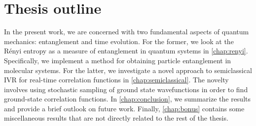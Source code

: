 \section{Thesis outline}

In the present work, we are concerned with two fundamental aspects of quantum mechanics: entanglement and time evolution.
For the former, we look at the Rényi entropy as a measure of entanglement in quantum systems in \cref{chap:renyi}.
Specifically, we implement a method for obtaining particle entanglement in molecular systems.
For the latter, we investigate a novel approach to semiclassical IVR for real-time correlation functions in \cref{chap:semiclassical}.
The novelty involves using stochastic sampling of ground state wavefunctions in order to find ground-state correlation functions.
In \cref{chap:conclusion}, we summarize the results and provide a brief outlook on future work.
Finally, \cref{chap:bonus} contains some miscellaneous results that are not directly related to the rest of the thesis.

